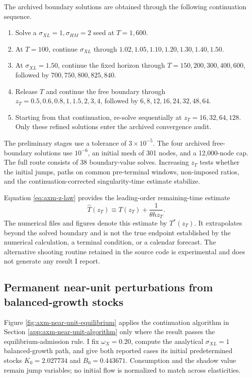 The archived boundary solutions are obtained through the following continuation
sequence.
\begin{enumerate}[label=\textbf{Step \arabic*.},leftmargin=4.5em,labelsep=0.6em]
 \item Solve a \(\sigma_{XL}=1,\sigma_{HM}=2\) seed at \(T=1{,}600\).
 \item At \(T=100\), continue \(\sigma_{XL}\) through
 \(1.02,1.05,1.10,1.20,1.30,1.40,1.50\).
 \item At \(\sigma_{XL}=1.50\), continue the fixed horizon through
 \(T=150,200,300,400,600\), followed by \(700,750,800,825,840\).
 \item Release \(T\) and continue the free boundary through
 \(z_T=0.5,0.6,0.8,1,1.5,2,3,4\), followed by
 \(6,8,12,16,24,32,48,64\).
 \item Starting from that continuation, re-solve sequentially at
 \(z_T=16,32,64,128\). Only these refined solutions enter the archived
convergence audit.
\end{enumerate}
The preliminary stages use a tolerance of \(3\times10^{-5}\). The four archived
free-boundary solutions use \(10^{-6}\), an initial mesh of 301 nodes, and a
12,000-node cap. The full route consists of 38 boundary-value solves. Increasing
\(z_T\) tests whether the initial jumps, paths on common pre-terminal windows,
non-imposed ratios, and the continuation-corrected singularity-time estimate stabilize.

Equation \eqref{eq:axm-z-law} provides the leading-order remaining-time estimate
\begin{equation}
 \widehat T(z_T)\equiv T(z_T)+\frac{1}{\theta h z_T}.
 \label{eq:axm-singularity-tail-estimate}
\end{equation}
The numerical files and figures denote this estimate by \(T^*(z_T)\). It
extrapolates beyond the solved boundary and is not the true endpoint established
by the numerical calculation, a terminal condition, or a calendar forecast. The
alternative shooting routine retained in the source code is experimental and
does not generate any result I report.

\subsection{Permanent near-unit perturbations from balanced-growth stocks}
\label{app:axm-near-unit-equilibrium-paths}

Figure \ref{fig:axm-near-unit-equilibrium} applies the continuation algorithm in
Section \ref{app:axm-near-unit-algorithm} only where the result passes the
equilibrium-admission rule. I
fix \(\omega_X=0.20\), compute the analytical \(\sigma_{XL}=1\) balanced-growth
path, and give both reported cases its initial predetermined stocks
\(K_0=2.027734\) and \(B_0=0.443671\). Consumption and the shadow value remain
jump variables; no initial flow is normalized to match across elasticities.


